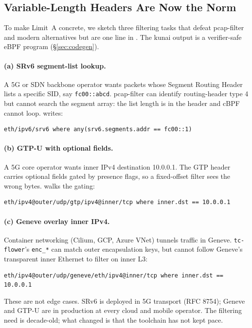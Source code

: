 \subsection{Variable-Length Headers Are Now the Norm}
\label{sec:varlen-norm}

To make Limit~A concrete, we sketch three filtering tasks that defeat
pcap-filter and modern alternatives but are one line in
\kunai. The kunai output is a verifier-safe eBPF program (\S\ref{sec:codegen}).

\paragraph{(a) SRv6 segment-list lookup.}
A 5G or SDN backbone operator wants packets whose Segment Routing
Header lists a specific SID, say \texttt{fc00::abcd}. pcap-filter
can identify routing-header type 4 but cannot search the segment array:
the list length is in the header and cBPF cannot loop. \kunai writes:
\begin{lstlisting}[style=kunai]
eth/ipv6/srv6 where any(srv6.segments.addr == fc00::1)
\end{lstlisting}

\paragraph{(b) GTP-U with optional fields.}
A 5G core operator wants inner IPv4 destination 10.0.0.1. The GTP
header carries optional fields gated by presence flags, so a
fixed-offset filter sees the wrong bytes. \kunai walks the gating:
\begin{lstlisting}[style=kunai]
eth/ipv4@outer/udp/gtp/ipv4@inner/tcp where inner.dst == 10.0.0.1
\end{lstlisting}

\paragraph{(c) Geneve overlay inner IPv4.}
Container networking (Cilium, GCP, Azure VNet) tunnels traffic in
Geneve. \texttt{tc-flower}'s \texttt{enc\_*} can match outer
encapsulation keys, but cannot follow Geneve's transparent inner
Ethernet to filter on inner L3:
\begin{lstlisting}[style=kunai]
eth/ipv4@outer/udp/geneve/eth/ipv4@inner/tcp where inner.dst == 10.0.0.1
\end{lstlisting}

These are not edge cases. SRv6 is deployed in 5G transport (RFC 8754);
Geneve and GTP-U are in production at every cloud and mobile
operator. The filtering need is decade-old; what changed is that the
toolchain has not kept pace.

